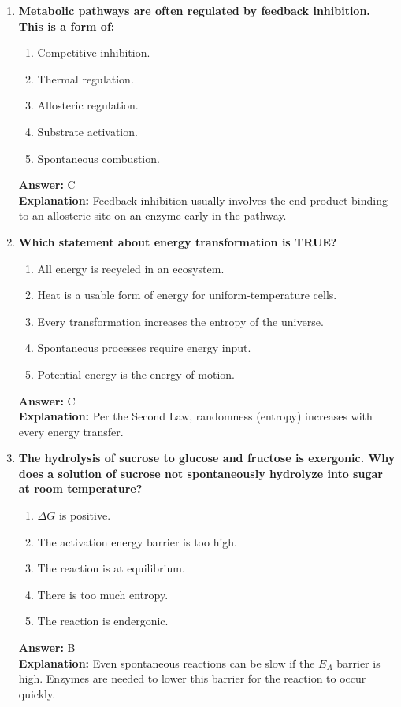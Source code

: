 \documentclass[11pt, a4paper]{article}
\begin{document}
\begin{enumerate}[leftmargin=*, label=\arabic*.]
\item \textbf{Metabolic pathways are often regulated by feedback inhibition. This is a form of:}
\begin{enumerate}[label=\Alph*.]
    \item Competitive inhibition.
    \item Thermal regulation.
    \item Allosteric regulation.
    \item Substrate activation.
    \item Spontaneous combustion.
\end{enumerate}
\textbf{Answer:} C \\
\textbf{Explanation:} Feedback inhibition usually involves the end product binding to an allosteric site on an enzyme early in the pathway.

\item \textbf{Which statement about energy transformation is TRUE?}
\begin{enumerate}[label=\Alph*.]
    \item All energy is recycled in an ecosystem.
    \item Heat is a usable form of energy for uniform-temperature cells.
    \item Every transformation increases the entropy of the universe.
    \item Spontaneous processes require energy input.
    \item Potential energy is the energy of motion.
\end{enumerate}
\textbf{Answer:} C \\
\textbf{Explanation:} Per the Second Law, randomness (entropy) increases with every energy transfer.

\item \textbf{The hydrolysis of sucrose to glucose and fructose is exergonic. Why does a solution of sucrose not spontaneously hydrolyze into sugar at room temperature?}
\begin{enumerate}[label=\Alph*.]
    \item $\Delta G$ is positive.
    \item The activation energy barrier is too high.
    \item The reaction is at equilibrium.
    \item There is too much entropy.
    \item The reaction is endergonic.
\end{enumerate}
\textbf{Answer:} B \\
\textbf{Explanation:} Even spontaneous reactions can be slow if the $E_A$ barrier is high. Enzymes are needed to lower this barrier for the reaction to occur quickly.


\end{enumerate}
\end{document}
